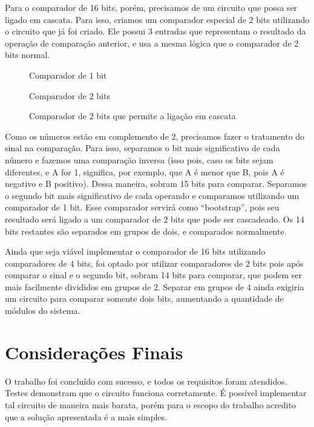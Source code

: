 \documentclass[twocolumn]{article}
\begin{document}
Para o comparador de 16 bits, porém, precisamos de um circuito que possa ser
ligado em cascata. Para isso, criamos um comparador especial de 2 bits
utilizando o circuito que já foi criado. Ele possui 3 entradas que representam o
resultado da operação de comparação anterior, e usa a mesma lógica que o
comparador de 2 bits normal.

\begin{strip}
    \centering 
\end{strip}

\begin{figure}
    
    \caption{Comparador de 1 bit}
\end{figure}

\begin{figure}
    
    \caption{Comparador de 2 bits}
\end{figure}

\begin{figure}
    
    \caption{Comparador de 2 bits que permite a ligação em cascata}
\end{figure}

Como os números estão em complemento de 2, precisamos fazer o tratamento do
sinal na comparação. Para isso, separamos o bit mais significativo de cada
número e fazemos uma comparação inversa (isso pois, caso os bits sejam
diferentes, e A for 1, significa, por exemplo, que A é menor que B, pois A é
negativo e B positivo). Dessa maneira, sobram 15 bits para comparar. Separamos o
segundo bit mais significativo de cada operando e comparamos utilizando um
comparador de 1 bit. Esse comparador servirá como ``bootstrap'', pois seu
resultado será ligado a um comparador de 2 bits que pode ser cascadeado. Os 14
bits restantes são separados em grupos de dois, e comparados normalmente.

Ainda que seja viável implementar o comparador de 16 bits utilizando
comparadores de 4 bits, foi optado por utilizar comparadores de 2 bits pois após
comparar o sinal e o segundo bit, sobram 14 bits para comparar, que podem ser
mais facilmente divididos em grupos de 2. Separar em grupos de 4 ainda exigiria
um circuito para comparar somente dois bits, aumentando a quantidade de módulos
do sistema.

\section{Considerações Finais}

O trabalho foi concluído com sucesso, e todos os requisitos foram atendidos.
Testes demonstram que o circuito funciona corretamente. É possível implementar
tal circuito de maneira mais barata, porém para o escopo do trabalho acredito
que a solução apresentada é a mais simples.
\end{document}
